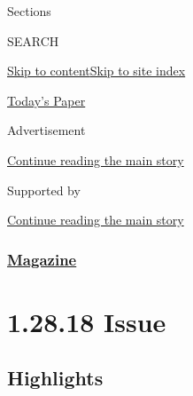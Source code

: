 Sections

SEARCH

\protect\hyperlink{site-content}{Skip to
content}\protect\hyperlink{site-index}{Skip to site index}

\href{https://myaccount.nytimes3xbfgragh.onion/auth/login?response_type=cookie\&client_id=vi}{}

\href{https://www.nytimes3xbfgragh.onion/section/todayspaper}{Today's
Paper}

Advertisement

\protect\hyperlink{after-top}{Continue reading the main story}

Supported by

\protect\hyperlink{after-sponsor}{Continue reading the main story}

\hypertarget{magazine}{%
\subsubsection{\texorpdfstring{\href{/section/magazine}{Magazine}}{Magazine}}\label{magazine}}

\hypertarget{12818-issue}{%
\section{1.28.18 Issue}\label{12818-issue}}

\hypertarget{highlights}{%
\subsection{Highlights}\label{highlights}}

